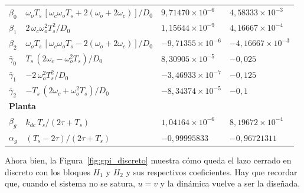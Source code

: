 \begin{table}[H]
\begin{tabular}{llll}
$\beta_0$  & $\omega_o T_s\,[\omega_c\omega_o T_s + 2(\omega_o + 2\omega_c)]/D_0$ & $9{,}71470\times10^{-6}$ & $4{,}58333\times10^{-3}$ \\
$\beta_1$  & $2\,\omega_c\omega_o^2 T_s^2/D_0$                              & $1{,}15644\times10^{-9}$   & $4{,}16667\times10^{-4}$ \\
$\beta_2$  & $\omega_o T_s\,[\omega_c\omega_o T_s - 2(\omega_o + 2\omega_c)]/D_0$ & $-9{,}71355\times10^{-6}$ & $-4{,}16667\times10^{-3}$ \\
$\bar{\gamma}_0$ & $T_s\,(2\omega_c - \omega_o^2 T_s)/D_0$                        & $8{,}30905\times10^{-5}$   & $-0{,}025$ \\
$\bar{\gamma}_1$ & $-2\,\omega_o^2 T_s^2/D_0$                                     & $-3{,}46933\times10^{-7}$  & $-0{,}125$ \\
$\bar{\gamma}_2$ & $-T_s\,(2\omega_c + \omega_o^2 T_s)/D_0$                       & $-8{,}34374\times10^{-5}$  & $-0{,}1$ \\
\midrule
\multicolumn{4}{l}{\textbf{Planta}} \\
$\beta_g$  & $k_{dc}\,T_s/(2\tau + T_s)$                   & $1{,}04164\times10^{-6}$   & $8{,}19672\times10^{-4}$ \\
$\alpha_g$ & $(T_s - 2\tau)/(2\tau + T_s)$                 & $-0{,}99995833$            & $-0{,}96721311$ \\
\bottomrule
\end{tabular}
\end{table}


Ahora bien, la Figura~\ref{fig:gpi_discreto} muestra cómo queda el lazo cerrado en discreto con los
bloques $H_1$ y $H_2$ y sus respectivos coeficientes. Hay que recordar que, cuando el sistema no se
satura, $u = v$ y la dinámica vuelve a ser la diseñada.


